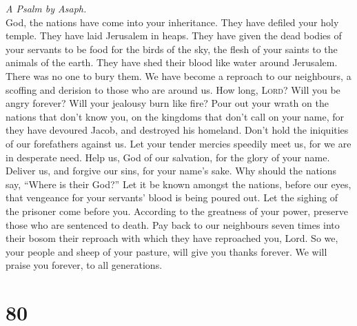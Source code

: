 \emph{A Psalm by Asaph.}\\
 God, the nations have come into your inheritance. They
have defiled your holy temple. They have laid Jerusalem in heaps.
 They have given the dead bodies of your servants to be
food for the birds of the sky, the flesh of your saints to the animals
of the earth.  They have shed their blood like water
around Jerusalem. There was no one to bury them.  We have
become a reproach to our neighbours, a scoffing and derision to those
who are around us.  How long, \textsc{Lord}? Will you be
angry forever? Will your jealousy burn like fire?  Pour
out your wrath on the nations that don't know you, on the kingdoms that
don't call on your name,  for they have devoured Jacob,
and destroyed his homeland.  Don't hold the iniquities of
our forefathers against us. Let your tender mercies speedily meet us,
for we are in desperate need.  Help us, God of our
salvation, for the glory of your name. Deliver us, and forgive our sins,
for your name's sake.  Why should the nations say,
``Where is their God?'' Let it be known amongst the nations, before our
eyes, that vengeance for your servants' blood is being poured out.
 Let the sighing of the prisoner come before you.
According to the greatness of your power, preserve those who are
sentenced to death.  Pay back to our neighbours seven
times into their bosom their reproach with which they have reproached
you, Lord.  So we, your people and sheep of your pasture,
will give you thanks forever. We will praise you forever, to all
generations.

\hypertarget{section-79}{%
\section{80}\label{section-79}}

